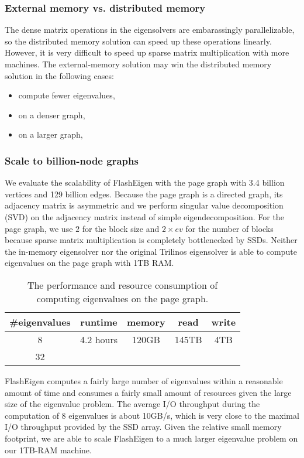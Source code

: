 \subsubsection{External memory vs. distributed memory}

The dense matrix operations in the eigensolvers are embarassingly parallelizable,
so the distributed memory solution can speed up these operations linearly.
However, it is very difficult to speed up sparse matrix multiplication with
more machines.
The external-memory solution may win the distributed memory solution
in the following cases:

\begin{itemize} \itemsep1pt \parskip0pt 
	\item compute fewer eigenvalues,
	\item on a denser graph,
	\item on a larger graph,
\end{itemize}

\subsubsection{Scale to billion-node graphs}

We evaluate the scalability of FlashEigen with the page graph with 3.4 billion
vertices and 129 billion edges. Because the page graph is a directed graph,
its adjacency matrix is asymmetric and we perform singular value decomposition
(SVD) on the adjacency matrix instead of simple eigendecomposition. For the page
graph, we use $2$ for the block size and $2 \times ev$ for the number of blocks
because sparse matrix multiplication is completely bottlenecked by SSDs.
Neither the in-memory eigensolver nor the original Trilinos eigensolver is able
to compute eigenvalues on the page graph with 1TB RAM.

\begin{table}
	\begin{center}
		\small
		\begin{tabular}{|c|c|c|c|c|}
			\hline
			\#eigenvalues & runtime & memory & read & write \\
			\hline
			8 & 4.2 hours & 120GB & 145TB & 4TB \\
			\hline
			32 & & & & \\
			\hline
		\end{tabular}
		\normalsize
	\end{center}
	\caption{The performance and resource consumption of computing eigenvalues
	on the page graph.}
	\label{pg_ev}
\end{table}

FlashEigen computes a fairly large number of eigenvalues within a reasonable
amount of time and consumes a fairly small amount of resources given the large
size of the eigenvalue problem.
The average I/O throughput during the computation of 8 eigenvalues is about
10GB/s, which is very close to the maximal I/O throughput provided by
the SSD array.
Given the relative small memory footprint, we are able to scale FlashEigen
to a much larger eigenvalue problem on our 1TB-RAM machine.
